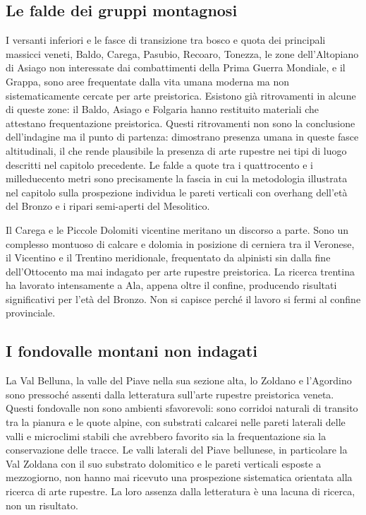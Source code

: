 \subsection*{Le falde dei gruppi montagnosi}

I versanti inferiori e le fasce di transizione tra bosco e quota dei principali massicci veneti, Baldo, Carega, Pasubio, Recoaro, Tonezza, le zone dell'Altopiano di Asiago non interessate dai combattimenti della Prima Guerra Mondiale, e il Grappa, sono aree frequentate dalla vita umana moderna ma non sistematicamente cercate per arte preistorica. Esistono già ritrovamenti in alcune di queste zone: il Baldo, Asiago e Folgaria hanno restituito materiali che attestano frequentazione preistorica. Questi ritrovamenti non sono la conclusione dell'indagine ma il punto di partenza: dimostrano presenza umana in queste fasce altitudinali, il che rende plausibile la presenza di arte rupestre nei tipi di luogo descritti nel capitolo precedente. Le falde a quote tra i quattrocento e i milleduecento metri sono precisamente la fascia in cui la metodologia illustrata nel capitolo sulla prospezione individua le pareti verticali con overhang dell'età del Bronzo e i ripari semi-aperti del Mesolitico.

Il Carega e le Piccole Dolomiti vicentine meritano un discorso a parte. Sono un complesso montuoso di calcare e dolomia in posizione di cerniera tra il Veronese, il Vicentino e il Trentino meridionale, frequentato da alpinisti sin dalla fine dell'Ottocento ma mai indagato per arte rupestre preistorica. La ricerca trentina ha lavorato intensamente a Ala, appena oltre il confine, producendo risultati significativi per l'età del Bronzo. Non si capisce perché il lavoro si fermi al confine provinciale.

\subsection*{I fondovalle montani non indagati}

La Val Belluna, la valle del Piave nella sua sezione alta, lo Zoldano e l'Agordino sono pressoché assenti dalla letteratura sull'arte rupestre preistorica veneta. Questi fondovalle non sono ambienti sfavorevoli: sono corridoi naturali di transito tra la pianura e le quote alpine, con substrati calcarei nelle pareti laterali delle valli e microclimi stabili che avrebbero favorito sia la frequentazione sia la conservazione delle tracce. Le valli laterali del Piave bellunese, in particolare la Val Zoldana con il suo substrato dolomitico e le pareti verticali esposte a mezzogiorno, non hanno mai ricevuto una prospezione sistematica orientata alla ricerca di arte rupestre. La loro assenza dalla letteratura è una lacuna di ricerca, non un risultato.

